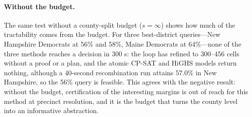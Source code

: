 \paragraph{Without the budget.}
The same test without a county-split budget ($s=\infty$) shows how much of the tractability comes from the budget. For three best-district queries---New Hampshire Democrats at 56\% and 58\%, Maine Democrats at 64\%---none of the three methods reaches a decision in 300 s: the loop has refined to 300--456 cells without a proof or a plan, and the atomic CP-SAT and HiGHS models return nothing, although a 40-second recombination run attains 57.0\% in New Hampshire, so the 56\% query is feasible. This agrees with the negative result: without the budget, certification of the interesting margins is out of reach for this method at precinct resolution, and it is the budget that turns the county level into an informative abstraction.
